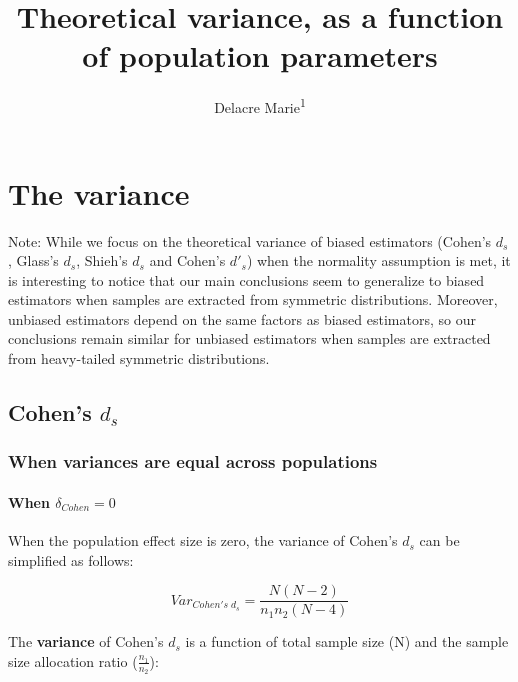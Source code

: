 \documentclass[
  man]{apa6}
\affiliation{
\vspace{0.5cm}
\textsuperscript{1} ULB}
\title{Theoretical variance, as a function of population parameters}
\author{Delacre Marie\textsuperscript{1}}
\date{}
\begin{document}
\maketitle

\hypertarget{the-variance}{%
\section{The variance}\label{the-variance}}

Note: While we focus on the theoretical variance of biased estimators (Cohen's \(d_s\), Glass's \(d_s\), Shieh's \(d_s\) and Cohen's \(d'_s\)) when the normality assumption is met, it is interesting to notice that our main conclusions seem to generalize to biased estimators when samples are extracted from symmetric distributions. Moreover, unbiased estimators depend on the same factors as biased estimators, so our conclusions remain similar for unbiased estimators when samples are extracted from heavy-tailed symmetric distributions.

\hypertarget{cohens-d_s}{%
\subsection{\texorpdfstring{Cohen's \(d_s\)}{Cohen's d\_s}}\label{cohens-d_s}}

\hypertarget{when-variances-are-equal-across-populations}{%
\subsubsection{When variances are equal across populations}\label{when-variances-are-equal-across-populations}}

\hypertarget{when-delta_cohen0}{%
\paragraph{\texorpdfstring{When \(\delta_{Cohen}=0\)}{When \textbackslash delta\_\{Cohen\}=0}}\label{when-delta_cohen0}}

When the population effect size is zero, the variance of Cohen's \(d_s\) can be simplified as follows:

\[Var_{Cohen's \; d_s} = \frac{N(N-2)}{n_1n_2(N-4)}\]

The \textbf{variance} of Cohen's \(d_s\) is a function of total sample size (N) and the sample size allocation ratio (\(\frac{n_1}{n_2}\)):
\end{document}
